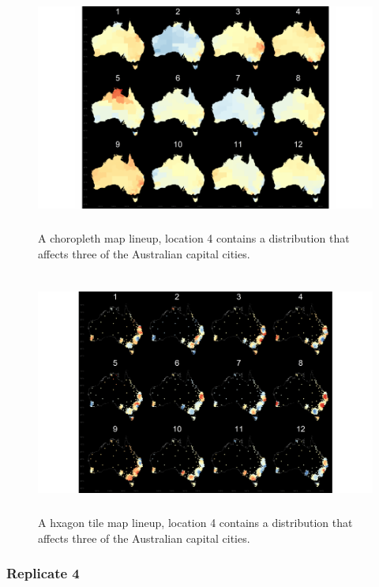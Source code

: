 \documentclass{monashthesis}
\begin{document}
\begin{figure}[H]
\centering
\includegraphics[height=8cm]{lineups/three-geo8-1.pdf}
\caption{\label{fig:three-geo8}A choropleth map lineup, location 4 contains a distribution that affects three of the Australian capital cities.}
\end{figure}

\begin{figure}[H]
\centering
\includegraphics[height=8cm]{lineups/three-hex8-1.pdf}
\caption{\label{fig:three-hex8}A hxagon tile map lineup, location 4 contains a distribution that affects three of the Australian capital cities.}
\end{figure}

\hypertarget{replicate-4-1}{%
\subsubsection{Replicate 4}\label{replicate-4-1}}
\end{document}
